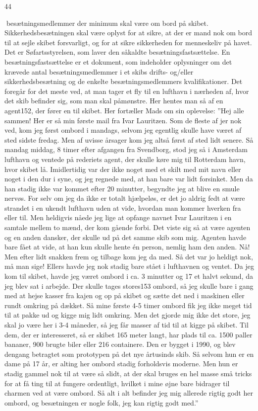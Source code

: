 44

besætningsmedlemmer der minimum skal være om bord på skibet.
Sikkerhedsbesætningen skal være oplyst for at sikre, at der er mand nok
om bord til at sejle skibet forsvarligt, og for at sikre sikkerheden for
menneskeliv på havet. Det er Søfartsstyrelsen, som laver den såkaldte
besætningsfastsættelse. En besætningsfastsættelse er et dokument, som
indeholder oplysninger om det krævede antal besætningsmedlemmer i et
skibs drifts- og/eller sikkerhedsbesætning og de enkelte
besætningsmedlemmers kvalifikationer. Det foregår for det meste ved, at
man tager et fly til en lufthavn i nærheden af, hvor det skib befinder
sig, som man skal påmønstre. Her hentes man så af en agent152, der fører
en til skibet. Her fortæller Mads om sin oplevelse: ''Hej alle sammen!
Her er så min første mail fra Ivar Lauritzen. Som de fleste af jer nok
ved, kom jeg først ombord i mandags, selvom jeg egentlig skulle have
været af sted sidste fredag. Men af uvisse årsager kom jeg altså først
af sted lidt senere. Så mandag middag, 8 timer efter afgangen fra
Svendborg, stod jeg så i Amsterdam lufthavn og ventede på rederiets
agent, der skulle køre mig til Rotterdam havn, hvor skibet lå.
Imidlertidig var der ikke noget med et skilt med mit navn eller noget i
den dur i syne, og jeg regnede med, at han bare var lidt forsinket. Men
da han stadig ikke var kommet efter 20 minutter, begyndte jeg at blive
en smule nervøs. For selv om jeg da ikke er totalt hjælpeløs, er det jo
aldrig fedt at være strandet i en ukendt lufthavn uden at vide, hvordan
man kommer hverken fra eller til. Men heldigvis nåede jeg lige at
opfange navnet Ivar Lauritzen i en samtale mellem to mænd, der kom
gående forbi. Det viste sig så at være agenten og en anden dansker, der
skulle ud på det samme skib som mig. Agenten havde bare fået at vide, at
han kun skulle hente én person, nemlig ham den anden. Nå! Men efter lidt
snakken frem og tilbage kom jeg da med. Så det var jo heldigt nok, må
man sige! Ellers havde jeg nok stadig bare stået i lufthavnen og ventet.
Da jeg kom til skibet, havde jeg været ombord i ca. 3 minutter og 17 et
halvt sekund, da jeg blev sat i arbejde. Der skulle tages stores153
ombord, så jeg skulle bare i gang med at hejse kasser fra kajen og op på
skibet og sætte det ned i maskinen eller rundt omkring på dækket. Så
mine første 4-5 timer ombord fik jeg ikke meget tid til at pakke ud og
kigge mig lidt omkring. Men det gjorde mig ikke det store, jeg skal jo
være her i 3-4 måneder, så jeg får masser af tid til at kigge på skibet.
Til dem, der er interesseret, så er skibet 165 meter langt, har plads
til ca. 1500 paller bananer, 900 brugte biler eller 216 containere. Den
er bygget i 1990, og blev dengang betragtet som prototypen på det nye
årtusinds skib. Så selvom hun er en dame på 17 år, er alting her ombord
stadig forholdsvis moderne. Men hun er stadig gammel nok til at være så
slidt, at der skal bruges en hel masse små tricks for at få ting til at
fungere ordentligt, hvilket i mine øjne bare bidrager til charmen ved at
være ombord. Så alt i alt befinder jeg mig allerede rigtig godt her
ombord, og besætningen er nogle folk, jeg kan rigtig godt med.''

